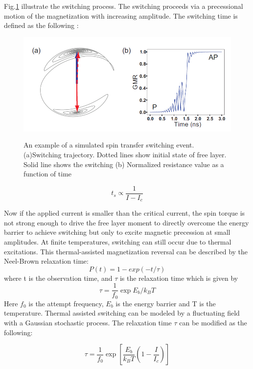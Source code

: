 Fig.\ref{fig:Switching}
illustrate the switching process. The switching proceeds via a precessional motion of the magnetization with increasing amplitude\cite{subswitch}. The switching time is defined as the following :


\begin{figure}[!ht]
\centering
\includegraphics[width=1.0\textwidth]{fig/switching.PNG}
\label{fig:Switching}
\caption{An example of a simulated spin transfer switching event.(a)Switching trajectory. Dotted lines show initial state of free layer. Solid line shows the switching (b) Normalized resistance value as a function of time}
\end{figure}

\begin{equation}
t_s \propto \frac{1}{I-I_c}
\end{equation}

Now if the applied current is smaller than the critical current, the spin torque is not strong enough to drive the free layer moment to directly overcome the energy barrier to achieve switching but only to excite magnetic precession at small amplitudes. At finite temperatures, switching can still occur due to thermal excitations. This thermal-assisted magnetization reversal can be described by the Neel-Brown relaxation time:
\begin{equation}
P(t) = 1 - exp(-t/\tau)
\end{equation}
where t is the observation time, and $\tau$ is the relaxation time which is given by
\begin{equation}
\tau = \frac{1}{f_0}\exp{E_b/k_B T}
\end{equation}
Here $f_0$ is the attempt frequency, $E_b$ is the energy barrier and T is the temperature. Thermal assisted switching can be modeled by a fluctuating field with a Gaussian stochastic process. The relaxation time $\tau$ can be modified as the following:

\begin{equation}
\tau = \frac{1}{f_0}\exp [\frac{E_b}{k_B T}(1 - \frac{I}{I_c})]
\end{equation}


